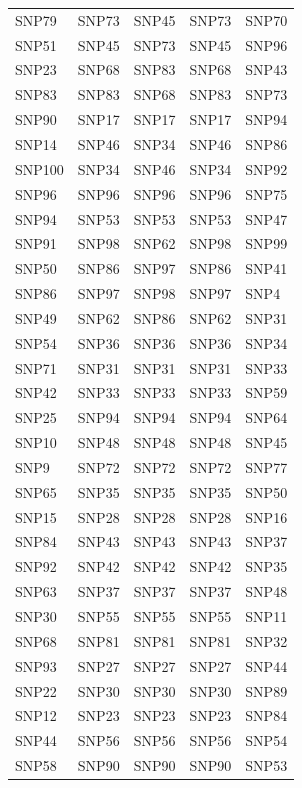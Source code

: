 \begin{table}[ht]
\begin{tabular}{lllll}
  SNP79 & SNP73 & SNP45 & SNP73 & SNP70 \\ 
  SNP51 & SNP45 & SNP73 & SNP45 & SNP96 \\ 
  SNP23 & SNP68 & SNP83 & SNP68 & SNP43 \\ 
  SNP83 & SNP83 & SNP68 & SNP83 & SNP73 \\ 
  SNP90 & SNP17 & SNP17 & SNP17 & SNP94 \\ 
  SNP14 & SNP46 & SNP34 & SNP46 & SNP86 \\ 
  SNP100 & SNP34 & SNP46 & SNP34 & SNP92 \\ 
  SNP96 & SNP96 & SNP96 & SNP96 & SNP75 \\ 
  SNP94 & SNP53 & SNP53 & SNP53 & SNP47 \\ 
  SNP91 & SNP98 & SNP62 & SNP98 & SNP99 \\ 
  SNP50 & SNP86 & SNP97 & SNP86 & SNP41 \\ 
  SNP86 & SNP97 & SNP98 & SNP97 & SNP4 \\ 
  SNP49 & SNP62 & SNP86 & SNP62 & SNP31 \\ 
  SNP54 & SNP36 & SNP36 & SNP36 & SNP34 \\ 
  SNP71 & SNP31 & SNP31 & SNP31 & SNP33 \\ 
  SNP42 & SNP33 & SNP33 & SNP33 & SNP59 \\ 
  SNP25 & SNP94 & SNP94 & SNP94 & SNP64 \\ 
  SNP10 & SNP48 & SNP48 & SNP48 & SNP45 \\ 
  SNP9 & SNP72 & SNP72 & SNP72 & SNP77 \\ 
  SNP65 & SNP35 & SNP35 & SNP35 & SNP50 \\ 
  SNP15 & SNP28 & SNP28 & SNP28 & SNP16 \\ 
  SNP84 & SNP43 & SNP43 & SNP43 & SNP37 \\ 
  SNP92 & SNP42 & SNP42 & SNP42 & SNP35 \\ 
  SNP63 & SNP37 & SNP37 & SNP37 & SNP48 \\ 
  SNP30 & SNP55 & SNP55 & SNP55 & SNP11 \\ 
  SNP68 & SNP81 & SNP81 & SNP81 & SNP32 \\ 
  SNP93 & SNP27 & SNP27 & SNP27 & SNP44 \\ 
  SNP22 & SNP30 & SNP30 & SNP30 & SNP89 \\ 
  SNP12 & SNP23 & SNP23 & SNP23 & SNP84 \\ 
  SNP44 & SNP56 & SNP56 & SNP56 & SNP54 \\ 
  SNP58 & SNP90 & SNP90 & SNP90 & SNP53 \\ 

\end{tabular}
\end{table}
